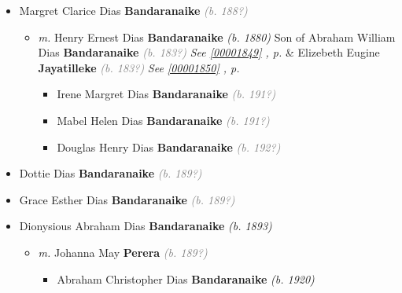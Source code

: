 \documentclass[10pt, openany]{book}
\begin{document}
\begin{itemize}
{\begin{itemize}
{\begin{itemize}
{\begin{itemize}
{\begin{itemize}
{\begin{itemize}
{\begin{itemize}
{\begin{itemize}
{\begin{itemize}
{\begin{itemize}
{\begin{itemize}
{\begin{itemize}
{    }
\end{itemize}}
\end{itemize}
   }
\item{Margret Clarice Dias \textbf{Bandaranaike} \textcolor{gray}{\textit{(b. 188?)}}
\begin{itemize}
\item{\textit{m.} Henry Ernest Dias \textbf{Bandaranaike} \textcolor{slorange}{\textit{(b. 1880)}} Son of  Abraham William Dias \textbf{Bandaranaike} \textcolor{gray}{\textit{(b. 183?)}} \textcolor{slteal}{\textit{See  \autoref{00001849} \textit{, p. \pageref{00001849} }}}  \&  Elizebeth Eugine \textbf{Jayatilleke} \textcolor{gray}{\textit{(b. 183?)}} \textcolor{slteal}{\textit{See  \autoref{00001850} \textit{, p. \pageref{00001850} }}}   \label{couple:00001981:00001982} \begin{itemize}
\item{Irene Margret Dias \textbf{Bandaranaike} \textcolor{gray}{\textit{(b. 191?)}}
   }
\item{Mabel Helen Dias \textbf{Bandaranaike} \textcolor{gray}{\textit{(b. 191?)}}
   }
\item{Douglas Henry Dias \textbf{Bandaranaike} \textcolor{gray}{\textit{(b. 192?)}}
   }
\end{itemize}}
\end{itemize}
   }
\item{Dottie Dias \textbf{Bandaranaike} \textcolor{gray}{\textit{(b. 189?)}}
  }
\item{Grace Esther Dias \textbf{Bandaranaike} \textcolor{gray}{\textit{(b. 189?)}}
   }
\item{Dionysious Abraham Dias \textbf{Bandaranaike} \textcolor{slorange}{\textit{(b. 1893)}}
\begin{itemize}
\item{\textit{m.} Johanna May \textbf{Perera} \textcolor{gray}{\textit{(b. 189?)}}   \label{couple:00002420:00002421} \begin{itemize}
\item{Abraham Christopher Dias \textbf{Bandaranaike} \textcolor{slorange}{\textit{(b. 1920)}}
}
\end{itemize}}
\end{itemize}}
\end{itemize}}
\end{itemize}}
\end{itemize}}
\end{itemize}}
\end{itemize}}
\end{itemize}}
\end{itemize}}
\end{itemize}}
\end{itemize}}
\end{itemize}
\end{document}

